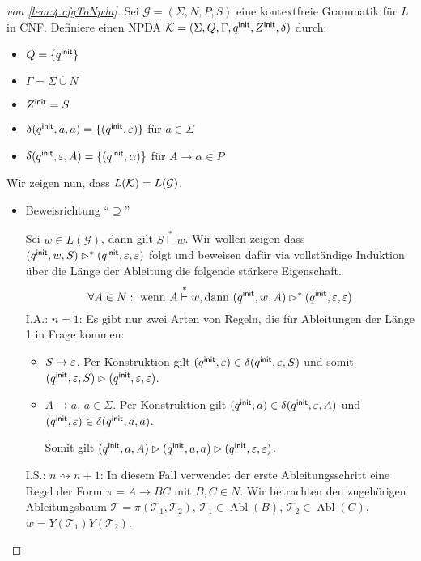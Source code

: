   
\begin{proof}[von \autoref{lem:4.cfgToNpda}]
Sei $\mathcal{G} = (\Sigma,N,P,S)$ eine kontextfreie Grammatik für $L$ in \ac{CNF}.
                Definiere einen \ac{NPDA} $\mathcal{K} = (\Sigma,Q,\Gamma,q^\mathsf{init},Z^\mathsf{init},\delta)$ durch:
                \begin{itemize}
                        \item $Q = \{q^\mathsf{init}\}$ 
                        \item $\Gamma = \Sigma\overset.\cup N$
                        \item $Z^\mathsf{init} = S$
                        \item $\delta(q^\mathsf{init},a,a) = \{(q^\mathsf{init},\varepsilon)\} $ für $ a\in\Sigma$
                        \item $\delta(q^\mathsf{init},\varepsilon,A) = \{(q^\mathsf{init},\alpha)\}$ für $A\to\alpha\in P$
                \end{itemize}
Wir zeigen nun, dass $L(\mathcal{K}) = L(\mathcal{G})$.
\begin{itemize}
 \item Beweisrichtung "`$\supseteq$"'
 
 Sei $w\in L(\mathcal{G})$, dann gilt $S\stackrel{*}{\vdash} w$.
 Wir wollen zeigen dass $(q^\mathsf{init}, w, S) \rhd^* (q^\mathsf{init}, \varepsilon, \varepsilon)$ folgt und beweisen dafür via vollständige Induktion über die Länge der Ableitung die folgende stärkere Eigenschaft.
     \begin{displaymath}
      \forall A \in N: \text{ wenn } A \stackrel{*}{\vdash} w, \text{dann } (q^\mathsf{init}, w, A) \rhd^* (q^\mathsf{init}, \varepsilon, \varepsilon)
    \end{displaymath}
  I.A.: $n=1$: Es gibt nur zwei Arten von Regeln, die für Ableitungen der Länge 1 in Frage kommen:
  \begin{itemize}
        \item $S \to \varepsilon$.
        Per Konstruktion gilt $(q^\mathsf{init}, \varepsilon) \in \delta(q^\mathsf{init}, \varepsilon, S)$ und somit $(q^\mathsf{init}, \varepsilon, S) \rhd (q^\mathsf{init}, \varepsilon, \varepsilon)$.
      \item $A \to a$, $a \in \Sigma$.
        Per Konstruktion gilt $(q^\mathsf{init}, a) \in \delta(q^\mathsf{init}, \varepsilon, A)$ und $(q^\mathsf{init}, \varepsilon) \in \delta(q^\mathsf{init}, a, a)$.

        Somit gilt $(q^\mathsf{init}, a, A) \rhd (q^\mathsf{init}, a, a) \rhd (q^\mathsf{init}, \varepsilon, \varepsilon)$.
   \end{itemize}
   
   I.S.: $n\rightsquigarrow n+1$: In diesem Fall verwendet der erste Ableitungsschritt eine Regel der Form $\pi = A \to BC$ mit $B,C \in N$.
   Wir betrachten den zugehörigen Ableitungsbaum $\mathcal{T} = \pi(\mathcal{T}_1, \mathcal{T}_2)$, $\mathcal{T}_1 \in \operatorname{Abl}(B)$, $\mathcal{T}_2 \in \operatorname{Abl}(C)$, $w = Y(\mathcal{T}_1)Y(\mathcal{T}_2)$.


\end{itemize}
\end{proof}
